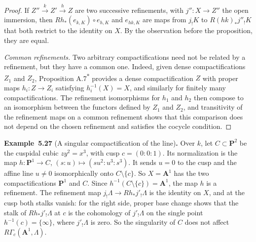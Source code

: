 \documentclass[11pt]{article}
\newenvironment{bpstatement}[2]{\par\addvspace{0.6\baselineskip}\noindent\textbf{#1}#2\textbf{.}\enspace\ignorespaces}
  {\par\addvspace{0.4\baselineskip}}
\newcommand{\bpout}[1]{#1\textsuperscript{\hyperlink{bp-outside}{\ensuremath{\ast}}}}
\begin{document}
\begin{proof}[{Proof}]
If \(Z''\xrightarrow{k}Z'\xrightarrow{h}Z\) are two successive refinements, with \(j'':X\to Z''\) the open immersion, then \(Rh_*(e_{k,K})\circ e_{h,K}\) and \(e_{hk,K}\) are maps from \(j_!K\) to \(R(hk)_*j''_!K\) that both restrict to the identity on \(X\). By the observation before the proposition, they are equal.

\emph{Common refinements.} Two arbitrary compactifications need not be related by a refinement, but they have a common one. Indeed, given dense compactifications \(Z_1\) and \(Z_2\), Proposition \bpout{A.7} provides a dense compactification \(Z\) with proper maps \(h_i:Z\to Z_i\) satisfying \(h_i^{-1}(X)=X\), and similarly for finitely many compactifications. The refinement isomorphisms for \(h_1\) and \(h_2\) then compose to an isomorphism between the functors defined by \(Z_1\) and \(Z_2\), and transitivity of the refinement maps on a common refinement shows that this comparison does not depend on the chosen refinement and satisfies the cocycle condition.
\end{proof}

\label{bp88}%
\begin{bpstatement}{Example~5.27}{ (A singular compactification of the line)}
Over \(k\), let \(C\subset\mathbf P^2\) be the cuspidal cubic \(zy^2=x^3\), with cusp \(c=(0:0:1)\). Its normalization is the map \(h:\mathbf P^1\to C\), \((s:u)\mapsto(su^2:u^3:s^3)\). It sends \(u=0\) to the cusp and the affine line \(u\neq0\) isomorphically onto \(C\setminus\{c\}\). So \(X=\mathbf A^1\) has the two compactifications \(\mathbf P^1\) and \(C\). Since \(h^{-1}(C\setminus\{c\})=\mathbf A^1\), the map \(h\) is a refinement. The refinement map \(j_!\Lambda\to Rh_*j'_!\Lambda\) is the identity on \(X\), and at the cusp both stalks vanish: for the right side, proper base change shows that the stalk of \(Rh_*j'_!\Lambda\) at \(c\) is the cohomology of \(j'_!\Lambda\) on the single point \(h^{-1}(c)=\{\infty\}\), where \(j'_!\Lambda\) is zero. So the singularity of \(C\) does not affect \(R\Gamma_c(\mathbf A^1,\Lambda)\).
\end{bpstatement}
\end{document}
